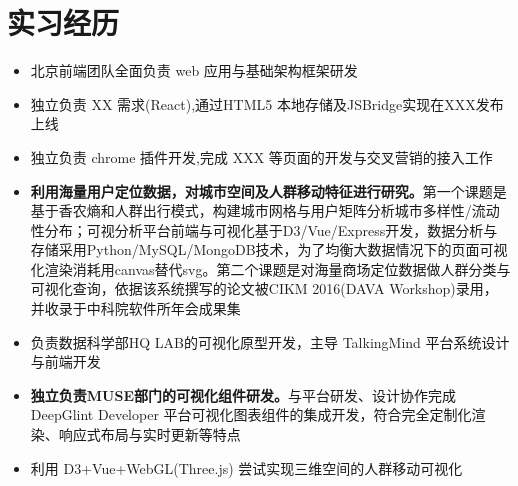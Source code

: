 \documentclass{resume}
\begin{document}

\section{实习经历}
\begin{itemize}
  \item 北京前端团队全面负责 web 应用与基础架构框架研发
  \item 独立负责 XX 需求(React),通过HTML5 本地存储及JSBridge实现在XXX发布上线
  \item 独立负责 chrome 插件开发,完成 XXX 等页面的开发与交叉营销的接入工作
\end{itemize}

\begin{itemize}
  \item \textbf{利用海量用户定位数据，对城市空间及人群移动特征进行研究。}第一个课题是基于香农熵和人群出行模式，构建城市网格与用户矩阵分析城市多样性/流动性分布；可视分析平台前端与可视化基于D3/Vue/Express开发，数据分析与存储采用Python/MySQL/MongoDB技术，为了均衡大数据情况下的页面可视化渲染消耗用canvas替代svg。第二个课题是对海量商场定位数据做人群分类与可视化查询，依据该系统撰写的论文被CIKM 2016(DAVA Workshop)录用，并收录于中科院软件所年会成果集
  \item 负责数据科学部HQ LAB的可视化原型开发，主导 TalkingMind 平台系统设计与前端开发
\end{itemize}

\begin{itemize}
  \item \textbf{独立负责MUSE部门的可视化组件研发。}与平台研发、设计协作完成 DeepGlint Developer 平台可视化图表组件的集成开发，符合完全定制化渲染、响应式布局与实时更新等特点
  \item 利用 D3+Vue+WebGL(Three.js) 尝试实现三维空间的人群移动可视化
\end{itemize}


\end{document}
